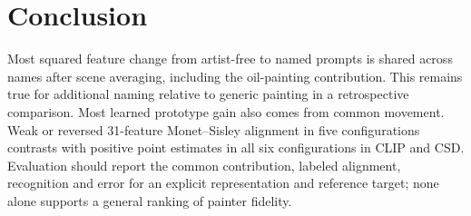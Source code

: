 \section{Conclusion}
Most squared feature change from artist-free to named prompts is shared across
names after scene averaging, including the oil-painting contribution.
This remains true for additional naming relative to generic painting in a
retrospective comparison.
Most learned prototype gain also comes from common movement. Weak or reversed
31-feature Monet--Sisley alignment in five configurations contrasts with positive
point estimates in all six configurations in CLIP and CSD.
Evaluation should report the common contribution, labeled alignment, recognition
and error for an explicit representation and reference target; none alone
supports a general ranking of painter fidelity.
